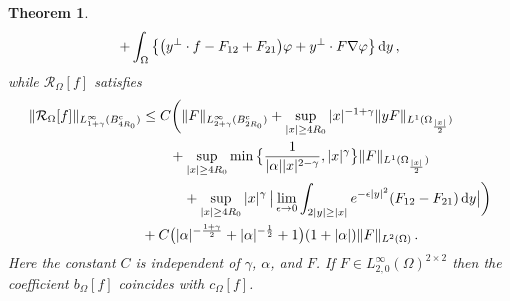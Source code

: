 \documentclass[11pt,a4paper]{article}
\newtheorem{theorem}{Theorem }[section]
\newcommand{\dd}{\,{\rm d}}
\begin{document}
\begin{theorem}
\begin{align}
\begin{split}
+ \int_\Omega 
\big\{ \big ( y^\bot \cdot f  - F_{12} + F_{21} \big ) \varphi  +  y^\bot\cdot F \nabla \varphi  \big\} \dd y\,,
\end{split}
\end{align}
%
while $\mathcal{R}_\Omega [f]$ satisfies 
%
\begin{align}
\begin{split}
\| \mathcal{R}_\Omega [f] \|_{L^{\infty}_{1+\gamma} (B^{{\rm c}}_{4R_{0}})}
& \le 
C \bigg ( 
\| F \|_{L^{\infty}_{2+\gamma} (B^{{\rm c}}_{2R_{0}})}
+ \sup_{|x|\geq 4 R_0} |x|^{-1 +\gamma} \| y F \|_{L^1 (\Omega_{ \frac{|x|}{2} })}  \\
&  \qquad 
+ \sup_{|x|\geq 4 R_0} \min \big \{ \frac{1}{|\alpha| |x|^{2-\gamma}}, |x|^\gamma \big \} 
\| F \|_{L^1 (\Omega_{ \frac{|x|}{2} })}  \\
& \quad \qquad  
+ \sup_{|x|\geq 4 R_0} |x|^\gamma \, \big | \lim_{\epsilon \rightarrow 0}  \int_{2 |y|\geq |x|} e^{-\epsilon |y|^2} (F_{12}-F_{21} ) \dd y \big | \bigg ) \\
&  
+ C \big ( |\alpha|^{-\frac{1+\gamma}{2}} + |\alpha|^{-\frac12} + 1 \big ) (1+|\alpha|) \| F\|_{L^2 (\Omega)} \,.
\label{est.thm.linear.exterior.4} 
\end{split}
\end{align}
%
Here the constant $C$ is independent of $\gamma$, $\alpha$, and $F$. If $F\in L^\infty_{2,0} (\Omega)^{2\times 2}$ then the coefficient $b_\Omega [f]$ coincides with $c_\Omega [f]$.
\end{theorem}
%
\end{document}
